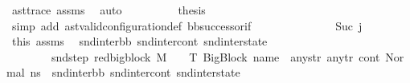 \begin{isabellebody}
\ ast{\isacharunderscore}{\kern0pt}trace\ assms{\isacharparenleft}{\kern0pt}{}{\isacharparenright}{\kern0pt}\ \isamarkupfalse%
\ auto\isanewline
\ \ \ \ \ \ \isamarkupfalse%
\ \isamarkupfalse%
\ {\isacharquery}{\kern0pt}thesis\ \isamarkupfalse%
\ {\isacharparenleft}{\kern0pt}simp\ add{\isacharcolon}{\kern0pt}\ ast{\isacharunderscore}{\kern0pt}valid{\isacharunderscore}{\kern0pt}configuration{\isacharunderscore}{\kern0pt}def\ bb{\isacharunderscore}{\kern0pt}successor{\isacharunderscore}{\kern0pt}if{\isacharparenright}{\kern0pt}\ \isanewline
\ \ \ \ \isamarkupfalse%
\isanewline
\ \ \ \ \ \ \isamarkupfalse%
\ {}{\isacharcolon}{\kern0pt}\ {\isacharparenleft}{\kern0pt}Suc\ j{\isacharprime}{\kern0pt}{\isacharparenright}{\kern0pt}\isanewline
\ \ \ \ \ \ \isamarkupfalse%
\ this\ assms{\isacharparenleft}{\kern0pt}{}{\isacharparenright}{\kern0pt}\ \isamarkupfalse%
\ snd{\isacharunderscore}{\kern0pt}inter{\isacharunderscore}{\kern0pt}bb\ snd{\isacharunderscore}{\kern0pt}inter{\isacharunderscore}{\kern0pt}cont\ snd{\isacharunderscore}{\kern0pt}inter{\isacharunderscore}{\kern0pt}state\ \isanewline
\ \ \ \ \ \ \ \ snd{\isacharunderscore}{\kern0pt}step{\isacharcolon}{\kern0pt}\ {\isachardoublequoteopen}red{\isacharunderscore}{\kern0pt}bigblock\ M\ {\isasymLambda}\ {\isasymGamma}\ {\isasymOmega}\ T\ {\isacharparenleft}{\kern0pt}{\isacharparenleft}{\kern0pt}BigBlock\ name\ {\isacharbrackleft}{\kern0pt}{\isacharbrackright}{\kern0pt}\ any{\isacharunderscore}{\kern0pt}str\ any{\isacharunderscore}{\kern0pt}tr{\isacharparenright}{\kern0pt}{\isacharcomma}{\kern0pt}\ cont{}{\isacharcomma}{\kern0pt}\ {\isacharparenleft}{\kern0pt}Normal\ ns{}{\isacharparenright}{\kern0pt}{\isacharparenright}{\kern0pt}\ \ {\isacharparenleft}{\kern0pt}snd{\isacharunderscore}{\kern0pt}inter{\isacharunderscore}{\kern0pt}bb{\isacharcomma}{\kern0pt}\ snd{\isacharunderscore}{\kern0pt}inter{\isacharunderscore}{\kern0pt}cont{\isacharcomma}{\kern0pt}\ snd{\isacharunderscore}{\kern0pt}inter{\isacharunderscore}{\kern0pt}state{\isacharparenright}{\kern0pt}{\isachardoublequoteclose}\ \isanewline

\end{isabellebody}
